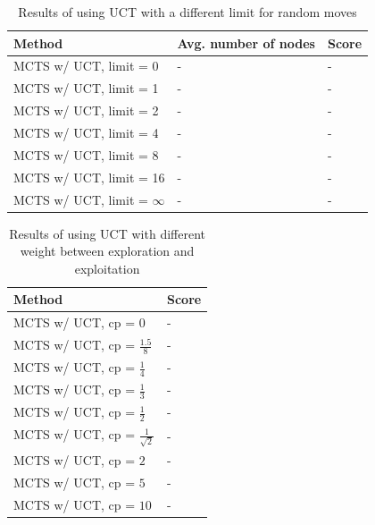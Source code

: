 \documentclass[10pt,a4paper]{article}
\begin{document}
\begin{table}[h]
	\centering
	\begin{tabular}{| l | l | l |}
		\hline
		\textbf{Method} & \textbf{Avg. number of nodes} & \textbf{Score} \\ \hline
		MCTS w/ UCT, limit = 0			& - & - \\ \hline
		MCTS w/ UCT, limit = 1			& - & - \\ \hline
		MCTS w/ UCT, limit = 2			& - & - \\ \hline
		MCTS w/ UCT, limit = 4			& - & - \\ \hline
		MCTS w/ UCT, limit = 8			& - & - \\ \hline
		MCTS w/ UCT, limit = 16			& - & - \\ \hline
		MCTS w/ UCT, limit = $\infty$	& - & - \\ \hline
	\end{tabular}
	\caption{Results of using UCT with a different limit for random moves}
	\label{tab:uct_results}
\end{table}

\begin{table}[h]
	\centering
	\begin{tabular}{| l | l |}
		\hline
		\textbf{Method} & \textbf{Score} \\ \hline
		MCTS w/ UCT, cp = 0			 			& - \\ \hline
		MCTS w/ UCT, cp = $\frac{1.5}{8}$		& - \\ \hline
		MCTS w/ UCT, cp = $\frac{1}{4}$		 	& - \\ \hline
		MCTS w/ UCT, cp = $\frac{1}{3}$		 	& - \\ \hline
		MCTS w/ UCT, cp = $\frac{1}{2}$		 	& - \\ \hline
		MCTS w/ UCT, cp = $\frac{1}{\sqrt{2}}$	& - \\ \hline
		MCTS w/ UCT, cp = $2$			 		& - \\ \hline
		MCTS w/ UCT, cp = $5$			 		& - \\ \hline
		MCTS w/ UCT, cp = $10$		 			& - \\ \hline
	\end{tabular}
	\caption{Results of using UCT with different weight between exploration and exploitation}
	\label{tab:uct_cp_results}
\end{table}
\end{document}
